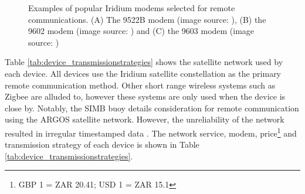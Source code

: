 \begin{figure}[H]
	\centering
	\begin{subfigure}[b]{0.3\textwidth}
	\end{subfigure}%
	\hfill
	\begin{subfigure}[b]{0.3\textwidth}
	\end{subfigure}%
	\hfill
	\begin{subfigure}[b]{0.3\textwidth}
	\end{subfigure}%
	\hfill
	\caption{Examples of popular Iridium modems selected for remote communications. (A) The 9522B modem (image source: \cite{9522B}), (B) the 9602 modem  (image source: \cite{9602}) and (C) the 9603 modem (image source: \cite{9603})} 
	\label{fig:irid_modem}
\end{figure}

Table \ref{tab:device_transmissionstrategies} shows the satellite network used by each device. All devices use the Iridium satellite constellation as the primary remote communication method. Other short range wireless systems such as Zigbee \cite{guimaraes2018surface} are alluded to, however these systems are only used when the device is close by. Notably, the SIMB buoy details consideration for remote communication using the ARGOS satellite network. However, the unreliability of the network resulted in irregular timestamped data \cite{PLANCK2019102792}. The network service, modem, price\footnote{GBP 1 = ZAR 20.41; USD 1 = ZAR 15.1} and transmission strategy of each device is shown in Table \ref{tab:device_transmissionstrategies}.


